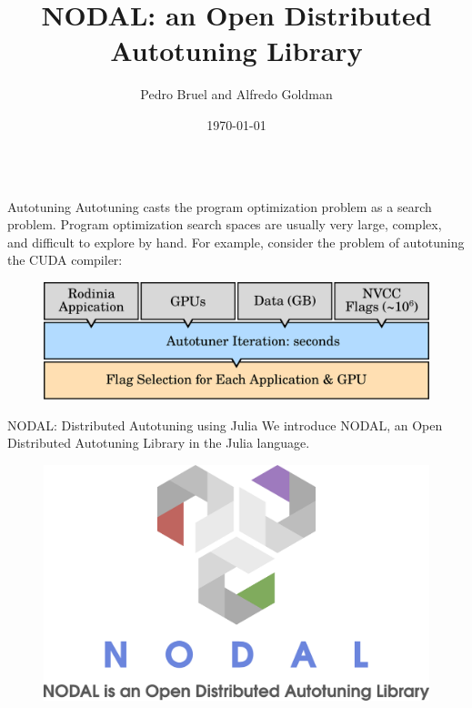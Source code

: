 \documentclass{beamer}
\title{NODAL: an Open Distributed Autotuning Library}
\author[phrb@ime.usp.br]{Pedro Bruel and Alfredo Goldman}
\institute{University of São Paulo, Brazil}
\date{\today}
\begin{document}
\begin{frame}
\begin{columns}[t]
    \begin{column}{.46\linewidth}
        \begin{block}{\Large Autotuning}
            \large
            Autotuning casts the program optimization problem as a search
            problem. Program optimization search spaces are usually very large,
            complex, and difficult to explore by hand.  For example, consider
            the problem of autotuning the CUDA compiler:
            \begin{figure}[htpb]
                \includegraphics[width=0.84\linewidth]{overview_gpus}
            \end{figure}
        \end{block}
        \begin{block}{\Large NODAL: Distributed Autotuning using Julia}
            \large
            We introduce NODAL, an Open Distributed Autotuning Library
            in the Julia language.
            \begin{figure}[htpb]
                \includegraphics[width=0.7\linewidth]{logo}
            \end{figure}


\end{block}
\end{column}
\end{columns}
\end{frame}
\end{document}
